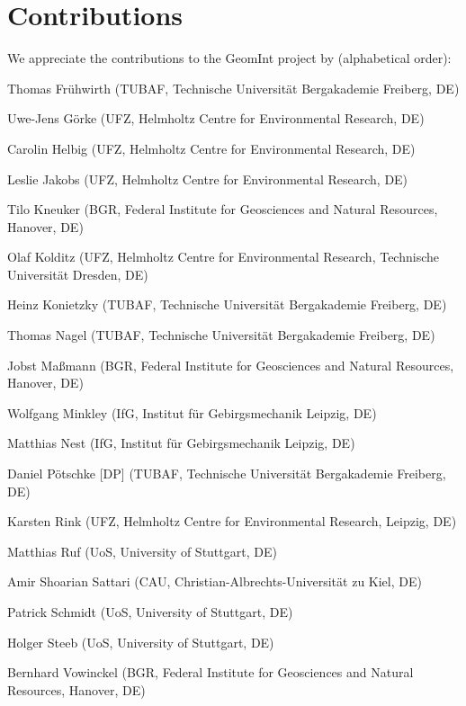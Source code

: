 \chapter*{Contributions}

We appreciate the contributions to the GeomInt project by  (alphabetical order):

\begin{list}{-}{\leftmargin=1em \itemindent=0em \itemsep=0.1em}
\item Thomas Fr\"uhwirth (TUBAF, Technische Universit\"at Bergakademie Freiberg, DE)	
\item Uwe-Jens G\"orke (UFZ, Helmholtz Centre for Environmental Research, DE)	
\item Carolin Helbig (UFZ, Helmholtz Centre for Environmental Research, DE)	
\item Leslie Jakobs (UFZ, Helmholtz Centre for Environmental Research, DE)
\item Tilo Kneuker (BGR, Federal Institute for Geosciences and Natural Resources, Hanover, DE)
\item Olaf Kolditz (UFZ, Helmholtz Centre for Environmental Research, Technische Universität Dresden, DE) \item Heinz Konietzky (TUBAF, Technische Universit\"at Bergakademie Freiberg, DE)	
\item Thomas Nagel (TUBAF, Technische Universit\"at Bergakademie Freiberg, DE) 
\item Jobst Ma{\ss}mann (BGR, Federal Institute for Geosciences and Natural Resources, Hanover, DE)
\item Wolfgang Minkley (IfG, Institut für Gebirgsmechanik Leipzig, DE)	
\item Matthias Nest (IfG, Institut für Gebirgsmechanik Leipzig, DE)	
\item Daniel P\"otschke [DP] (TUBAF, Technische Universit\"at Bergakademie Freiberg, DE)
\item Karsten Rink (UFZ, Helmholtz Centre for Environmental Research, Leipzig, DE) 
\item Matthias Ruf (UoS, University of Stuttgart, DE)
\item Amir Shoarian Sattari (CAU, Christian-Albrechts-Universität zu Kiel, DE)
\item Patrick Schmidt (UoS, University of Stuttgart, DE)	
\item Holger Steeb (UoS, University of Stuttgart, DE)	
\item Bernhard Vowinckel (BGR, Federal Institute for Geosciences and Natural Resources, Hanover, DE)	

\end{list}
